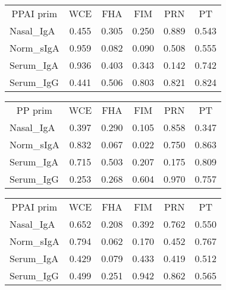 \documentclass[
]{article}
\begin{document}
\begin{tabular}{>{}l|>{}c|>{}c|>{}c|>{}c|c}
\hline
\multicolumn{1}{c|}{PPAI prim} & \multicolumn{1}{c|}{WCE} & \multicolumn{1}{c|}{FHA} & \multicolumn{1}{c|}{FIM} & \multicolumn{1}{c|}{PRN} & \multicolumn{1}{c}{PT} \\
\cline{1-1} \cline{2-2} \cline{3-3} \cline{4-4} \cline{5-5} \cline{6-6}
Nasal\_IgA & 0.455 & 0.305 & 0.250 & 0.889 & 0.543\\
\hline
Norm\_sIgA & 0.959 & 0.082 & 0.090 & 0.508 & 0.555\\
\hline
Serum\_IgA & 0.936 & 0.403 & 0.343 & 0.142 & 0.742\\
\hline
Serum\_IgG & 0.441 & 0.506 & 0.803 & 0.821 & 0.824\\
\hline
\end{tabular}

\begin{tabular}{>{}l|>{}c|>{}c|>{}c|>{}c|c}
\hline
\multicolumn{1}{c|}{PP prim} & \multicolumn{1}{c|}{WCE} & \multicolumn{1}{c|}{FHA} & \multicolumn{1}{c|}{FIM} & \multicolumn{1}{c|}{PRN} & \multicolumn{1}{c}{PT} \\
\cline{1-1} \cline{2-2} \cline{3-3} \cline{4-4} \cline{5-5} \cline{6-6}
Nasal\_IgA & 0.397 & 0.290 & 0.105 & 0.858 & 0.347\\
\hline
Norm\_sIgA & 0.832 & 0.067 & 0.022 & 0.750 & 0.863\\
\hline
Serum\_IgA & 0.715 & 0.503 & 0.207 & 0.175 & 0.809\\
\hline
Serum\_IgG & 0.253 & 0.268 & 0.604 & 0.970 & 0.757\\
\hline
\end{tabular}

\begin{tabular}{>{}l|>{}c|>{}c|>{}c|>{}c|c}
\hline
\multicolumn{1}{c|}{PPAI prim} & \multicolumn{1}{c|}{WCE} & \multicolumn{1}{c|}{FHA} & \multicolumn{1}{c|}{FIM} & \multicolumn{1}{c|}{PRN} & \multicolumn{1}{c}{PT} \\
\cline{1-1} \cline{2-2} \cline{3-3} \cline{4-4} \cline{5-5} \cline{6-6}
Nasal\_IgA & 0.652 & 0.208 & 0.392 & 0.762 & 0.550\\
\hline
Norm\_sIgA & 0.794 & 0.062 & 0.170 & 0.452 & 0.767\\
\hline
Serum\_IgA & 0.429 & 0.079 & 0.433 & 0.419 & 0.512\\
\hline
Serum\_IgG & 0.499 & 0.251 & 0.942 & 0.862 & 0.565\\
\hline
\end{tabular}
\end{document}
